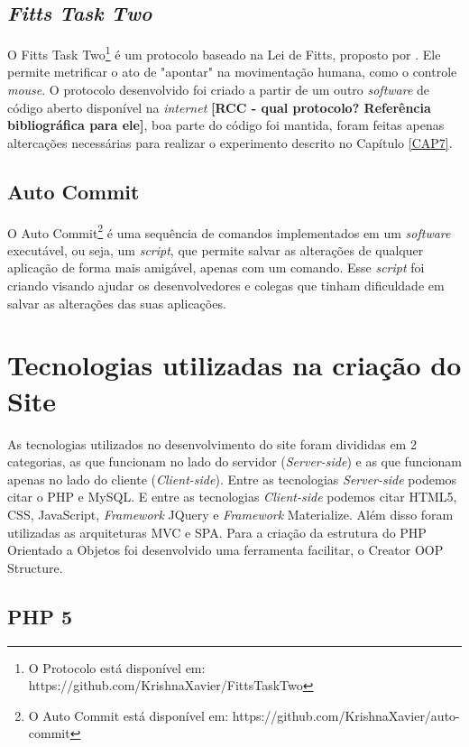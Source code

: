 \subsection{\textit{Fitts Task Two}}

O Fitts Task Two\footnote{O Protocolo está disponível em: https://github.com/KrishnaXavier/FittsTaskTwo} é um protocolo baseado na Lei de Fitts, proposto por . Ele permite metrificar o ato de "apontar" na movimentação humana, como o controle \textit{mouse}. O protocolo desenvolvido foi criado a partir de um outro \textit{software} de código aberto disponível na \textit{internet} \textbf{[RCC - qual protocolo? Referência bibliográfica para ele]}, boa parte do código foi mantida, foram feitas apenas altercações necessárias para realizar o experimento descrito no Capítulo \ref{CAP7}.

\subsection{Auto Commit}

O Auto Commit\footnote{O Auto Commit está disponível em: https://github.com/KrishnaXavier/auto-commit} é uma sequência de comandos implementados em um \textit{software} executável, ou seja, um \textit{script}, que permite salvar as alterações de qualquer aplicação de forma mais amigável, apenas com um comando. Esse \textit{script} foi criando visando ajudar os desenvolvedores e colegas que tinham dificuldade em salvar as alterações das suas aplicações.



\section{Tecnologias utilizadas na criação do Site}\label{Sub:tecnologias-site}
As tecnologias utilizados no desenvolvimento do site foram divididas em 2 categorias, as que funcionam no lado do servidor (\textit{Server-side}) e as que funcionam apenas no lado do cliente (\textit{Client-side}). Entre as tecnologias \textit{Server-side} podemos citar o PHP e MySQL. E entre as tecnologias \textit{Client-side} podemos citar HTML5, CSS, JavaScript, \textit{Framework }JQuery e \textit{Framework} Materialize. Além disso foram utilizadas as arquiteturas MVC e SPA. Para a criação da estrutura do PHP Orientado a Objetos foi desenvolvido uma ferramenta facilitar, o Creator OOP Structure.

\subsection{PHP 5}

